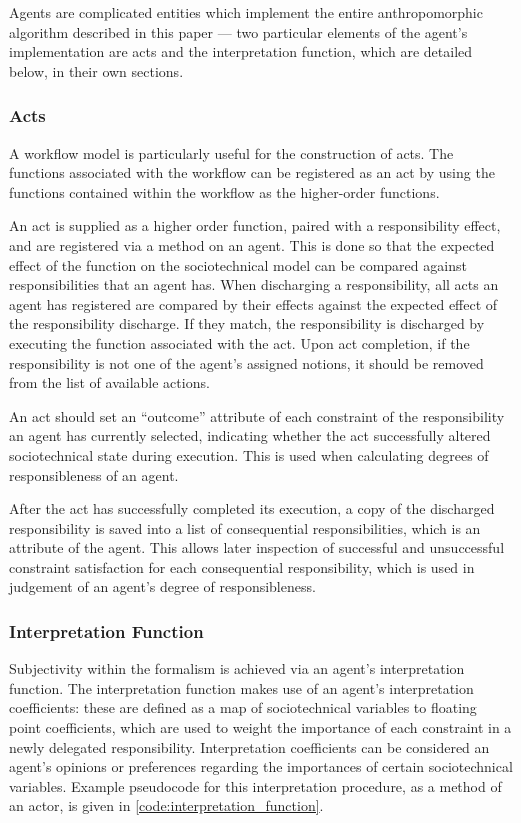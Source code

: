 Agents are complicated entities which implement the entire anthropomorphic algorithm described in this paper --- two particular elements of the agent's implementation are acts and the interpretation function, which are detailed below, in their own sections.

\subsubsection{Acts}
A workflow model is particularly useful for the construction of acts. The functions associated with the workflow can be registered as an act by using the functions contained within the workflow as the higher-order functions.\par

An act is supplied as a higher order function, paired with a responsibility effect, and are registered via a method on an agent. This is done so that the expected effect of the function on the sociotechnical model can be compared against responsibilities that an agent has. When discharging a responsibility, all acts an agent has registered are compared by their effects against the expected effect of the responsibility discharge. If they match, the responsibility is discharged by executing the function associated with the act. Upon act completion, if the responsibility is not one of the agent's assigned notions, it should be removed from the list of available actions.\par

An act should set an ``outcome'' attribute of each constraint of the responsibility an agent has currently selected, indicating whether the act successfully altered sociotechnical state during execution. This is used when calculating degrees of responsibleness of an agent.\par

After the act has successfully completed its execution, a copy of the discharged responsibility is saved into a list of consequential responsibilities, which is an attribute of the agent. This allows later inspection of successful and unsuccessful constraint satisfaction for each consequential responsibility, which is used in judgement of an agent's degree of responsibleness.\par

\subsubsection{Interpretation Function}\label{subsec:interpretation_function}
Subjectivity within the formalism is achieved via an agent's interpretation function. The interpretation function makes use of an agent's interpretation coefficients: these are defined as a map of sociotechnical variables to floating point coefficients, which are used to weight the importance of each constraint in a newly delegated responsibility. Interpretation coefficients can be considered an agent's opinions or preferences regarding the importances of certain sociotechnical variables. Example pseudocode for this interpretation procedure, as a method of an actor, is given in \cref{code:interpretation_function}.

